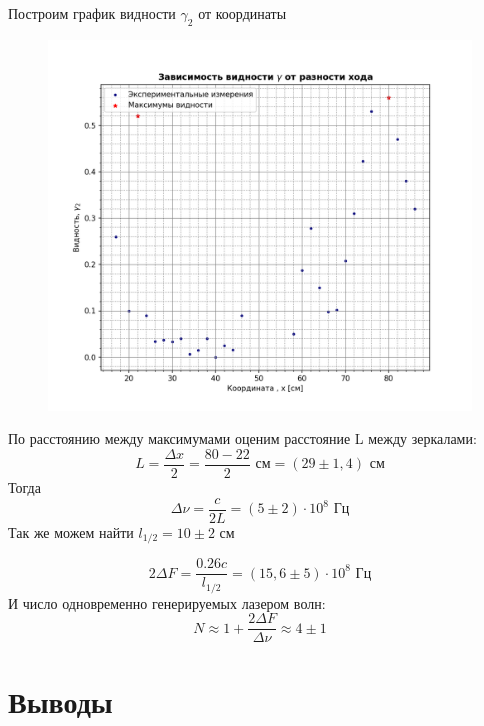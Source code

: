 \documentclass[a4paper, 12pt]{article}
\begin{document}
Построим график видности $\gamma_2$ от координаты
\begin{figure}[H]
    \centering
    \includegraphics[width=1\textwidth]{plot4--5--2-2.png}
    \label{fig:plot2}
\end{figure}
По расстоянию между максимумами оценим расстояние L между зеркалами:
\begin{equation*}
	L = \frac{\Delta x}{2} = \frac{80 - 22}{2} \text{ см} = (29 \pm 1,4) \text{ см}
\end{equation*}
Тогда
\begin{equation*}
	\Delta \nu = \frac{c}{2L} = (5 \pm 2) \cdot 10^8 \text{ Гц}
\end{equation*}
Так же можем найти $l_{1/2} = 10 \pm 2 \text{ см}$

\begin{equation*}
	2 \Delta F = \frac{0.26c}{l_{1/2}} = (15,6 \pm 5) \cdot 10^8 \text{ Гц}
\end{equation*}
И число одновременно генерируемых лазером волн:
\begin{equation*}
	N \approx 1 + \frac{2\Delta F}{\Delta \nu} \approx 4 \pm 1
\end{equation*}

\section{Выводы}
\end{document}
